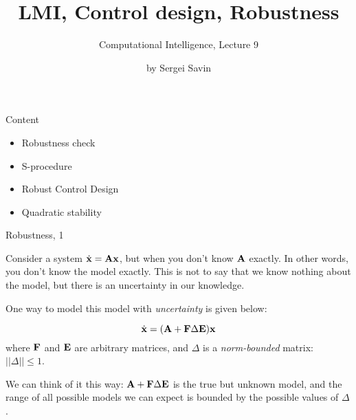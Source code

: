 \documentclass{beamer}
\title{LMI, Control design, Robustness}
\subtitle{Computational Intelligence, Lecture 9}
\author{by Sergei Savin}
\date{\mydate}
\begin{document}
\maketitle


\begin{frame}{Content}
	
	\begin{itemize}
		\item Robustness check
		\item S-procedure
		\item Robust Control Design
		\item Quadratic stability
	\end{itemize}
	
	
\end{frame}




\begin{frame}{Robustness, 1}
	\begin{flushleft}
		
		Consider a system $\dot{\mathbf{x}} = \mathbf{A}\mathbf{x}$, but when you don't know $\mathbf{A}$ exactly. In other words, you don't know the model exactly. This is not to say that we know nothing about the model, but there is an uncertainty in our knowledge.
		
		\bigskip
		
		One way to model this model with \emph{uncertainty} is given below:
		
		\begin{equation}
			\label{eq:uncertain}
			\dot{\mathbf{x}} = (\mathbf{A} + \mathbf{F} \Delta \mathbf{E})\mathbf{x}
		\end{equation}
		where $\mathbf{F}$ and $\mathbf{E}$ are arbitrary matrices, and $\Delta$ is a \emph{norm-bounded} matrix: $||\Delta|| \leq 1$.
		
		\bigskip
		
		We can think of it this way: $\mathbf{A} + \mathbf{F} \Delta \mathbf{E}$ is the true but unknown model, and the range of all possible models we can expect is bounded by the possible values of $\Delta$.
		
	\end{flushleft}
\end{frame}
\end{document}
